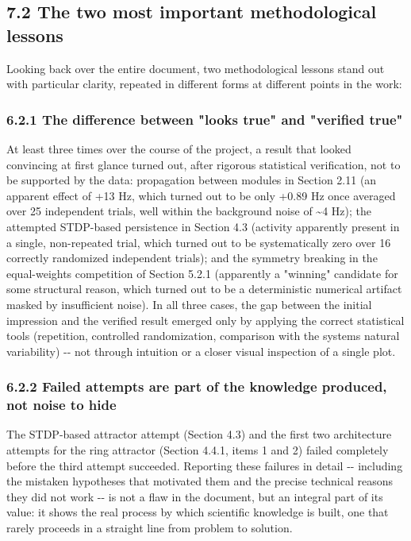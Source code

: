 \documentclass[
  english,
]{article}
\begin{document}
\subsection{7.2 The two most important methodological lessons}\label{the-two-most-important-methodological-lessons}

Looking back over the entire document, two methodological lessons stand out with particular clarity, repeated in different forms at different points in the work:

\subsubsection{6.2.1 The difference between "looks true" and "verified true"}\label{the-difference-between-looks-true-and-verified-true}

At least three times over the course of the project, a result that looked convincing at first glance turned out, after rigorous statistical verification, not to be supported by the data: propagation between modules in Section 2.11 (an apparent effect of +13 Hz, which turned out to be only +0.89 Hz once averaged over 25 independent trials, well within the background noise of \textasciitilde4 Hz); the attempted STDP-based persistence in Section 4.3 (activity apparently present in a single, non-repeated trial, which turned out to be systematically zero over 16 correctly randomized independent trials); and the symmetry breaking in the equal-weights competition of Section 5.2.1 (apparently a "winning" candidate for some structural reason, which turned out to be a deterministic numerical artifact masked by insufficient noise). In all three cases, the gap between the initial impression and the verified result emerged only by applying the correct statistical tools (repetition, controlled randomization, comparison with the system\textquotesingle s natural variability) -\/- not through intuition or a closer visual inspection of a single plot.

\subsubsection{6.2.2 Failed attempts are part of the knowledge produced, not noise to hide}\label{failed-attempts-are-part-of-the-knowledge-produced-not-noise-to-hide}

The STDP-based attractor attempt (Section 4.3) and the first two architecture attempts for the ring attractor (Section 4.4.1, items 1 and 2) failed completely before the third attempt succeeded. Reporting these failures in detail -\/- including the mistaken hypotheses that motivated them and the precise technical reasons they did not work -\/- is not a flaw in the document, but an integral part of its value: it shows the real process by which scientific knowledge is built, one that rarely proceeds in a straight line from problem to solution.
\end{document}

